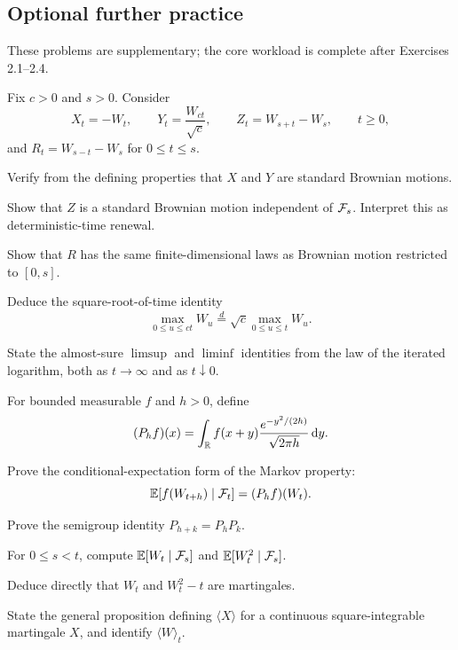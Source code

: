 \subsection*{Optional further practice}
\noindent These problems are supplementary; the core workload is complete after Exercises 2.1--2.4.
\setcounter{exercise}{4}
\begin{exercise}
Fix \(c>0\) and \(s>0\). Consider
\[
X_t=-W_t,
\qquad
Y_t=\frac{W_{ct}}{\sqrt c},
\qquad
Z_t=W_{s+t}-W_s,\qquad t\geq0,
\]
and \(R_t=W_{s-t}-W_s\) for \(0\leq t\leq s\).
\begin{exparts}
  \item Verify from the defining properties that \(X\) and \(Y\) are
  standard Brownian motions.
  \item Show that \(Z\) is a standard Brownian motion independent of
  \(\mathcal F_s\). Interpret this as deterministic-time renewal.
  \item Show that \(R\) has the same finite-dimensional laws as Brownian
  motion restricted to \([0,s]\).
  \item Deduce the square-root-of-time identity
  \[
  \max_{0\leq u\leq ct}W_u
  \overset{d}=\sqrt c\max_{0\leq u\leq t}W_u.
  \]
  \item State the almost-sure \(\limsup\) and \(\liminf\) identities from
  the law of the iterated logarithm, both as \(t\to\infty\) and as
  \(t\downarrow0\).
\end{exparts}
\end{exercise}

\begin{exercise}
For bounded measurable \(f\) and \(h>0\), define
\[
(P_hf)(x)=\int_{\mathbb{R}}f(x+y)
\frac{e^{-y^2/(2h)}}{\sqrt{2\pi h}}\,\mathrm d y.
\]
\begin{exparts}
  \item Prove the conditional-expectation form of the Markov property:
  \[
  \mathbb E[f(W_{t+h})\mid\mathcal F_t]=(P_hf)(W_t).
  \]
  \item Prove the semigroup identity \(P_{h+k}=P_hP_k\).
  \item For \(0\leq s<t\), compute
  \(\mathbb E[W_t\mid\mathcal F_s]\) and \(\mathbb E[W_t^2\mid\mathcal F_s]\).
  \item Deduce directly that \(W_t\) and \(W_t^2-t\) are martingales.
  \item State the general proposition defining \(\langle X\rangle\) for a
  continuous square-integrable martingale \(X\), and identify
  \(\langle W\rangle_t\).
\end{exparts}
\end{exercise}

